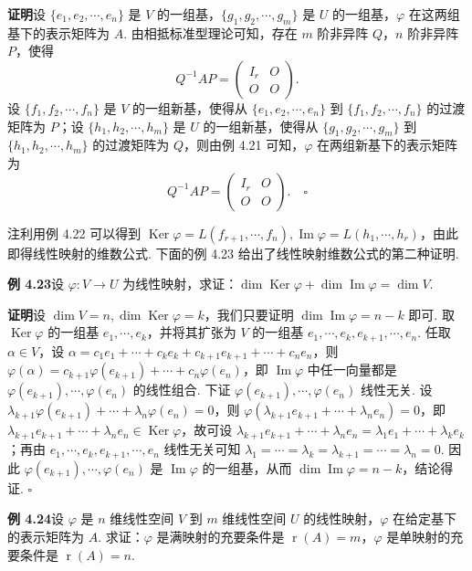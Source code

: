 \documentclass[UTF8,12pt,a4paper,fontset=fandol]{ctexart}
\begin{document}
\noindent\textbf{证明}\quad 设 $\{e_1,e_2,\cdots,e_n\}$ 是 $V$ 的一组基，$\{g_1,g_2,\cdots,g_m\}$ 是 $U$ 的一组基，$\varphi$ 在这两组基下的表示矩阵为 $A$. 由相抵标准型理论可知，存在 $m$ 阶非异阵 $Q$，$n$ 阶非异阵 $P$，使得
\[
Q^{-1}AP=\left(\begin{array}{cc}
I_r & O\\
O & O
\end{array}\right).
\]
设 $\{f_1,f_2,\cdots,f_n\}$ 是 $V$ 的一组新基，使得从 $\{e_1,e_2,\cdots,e_n\}$ 到 $\{f_1,f_2,\cdots,f_n\}$ 的过渡矩阵为 $P$；设 $\{h_1,h_2,\cdots,h_m\}$ 是 $U$ 的一组新基，使得从 $\{g_1,g_2,\cdots,g_m\}$ 到 $\{h_1,h_2,\cdots,h_m\}$ 的过渡矩阵为 $Q$，则由例 4.21 可知，$\varphi$ 在两组新基下的表示矩阵为
\[
Q^{-1}AP=\left(\begin{array}{cc}
I_r & O\\
O & O
\end{array}\right). \quad \square
\]

注\quad 利用例 4.22 可以得到 $\operatorname{Ker}\varphi=L(f_{r+1},\cdots,f_n),\operatorname{Im}\varphi=L(h_1,\cdots,h_r)$，由此即得线性映射的维数公式. 下面的例 4.23 给出了线性映射维数公式的第二种证明.

\noindent\textbf{例 4.23}\quad 设 $\varphi:V\to U$ 为线性映射，求证：$\dim\operatorname{Ker}\varphi+\dim\operatorname{Im}\varphi=\dim V$.

\noindent\textbf{证明}\quad 设 $\dim V=n,\dim\operatorname{Ker}\varphi=k$，我们只要证明 $\dim\operatorname{Im}\varphi=n-k$ 即可. 取 $\operatorname{Ker}\varphi$ 的一组基 $e_1,\cdots,e_k$，并将其扩张为 $V$ 的一组基 $e_1,\cdots,e_k,e_{k+1},\cdots,e_n$. 任取 $\alpha\in V$，设 $\alpha=c_1e_1+\cdots+c_ke_k+c_{k+1}e_{k+1}+\cdots+c_ne_n$，则 $\varphi(\alpha)=c_{k+1}\varphi(e_{k+1})+\cdots+c_n\varphi(e_n)$，即 $\operatorname{Im}\varphi$ 中任一向量都是 $\varphi(e_{k+1}),\cdots,\varphi(e_n)$ 的线性组合. 下证 $\varphi(e_{k+1}),\cdots,\varphi(e_n)$ 线性无关. 设 $\lambda_{k+1}\varphi(e_{k+1})+\cdots+\lambda_n\varphi(e_n)=0$，则 $\varphi(\lambda_{k+1}e_{k+1}+\cdots+\lambda_ne_n)=0$，即 $\lambda_{k+1}e_{k+1}+\cdots+\lambda_ne_n\in\operatorname{Ker}\varphi$，故可设 $\lambda_{k+1}e_{k+1}+\cdots+\lambda_ne_n=\lambda_1e_1+\cdots+\lambda_ke_k$；再由 $e_1,\cdots,e_k,e_{k+1},\cdots,e_n$ 线性无关可知 $\lambda_1=\cdots=\lambda_k=\lambda_{k+1}=\cdots=\lambda_n=0$. 因此 $\varphi(e_{k+1}),\cdots,\varphi(e_n)$ 是 $\operatorname{Im}\varphi$ 的一组基，从而 $\dim\operatorname{Im}\varphi=n-k$，结论得证. $\square$

\noindent\textbf{例 4.24}\quad 设 $\varphi$ 是 $n$ 维线性空间 $V$ 到 $m$ 维线性空间 $U$ 的线性映射，$\varphi$ 在给定基下的表示矩阵为 $A$. 求证：$\varphi$ 是满映射的充要条件是 $\operatorname{r}(A)=m$，$\varphi$ 是单映射的充要条件是 $\operatorname{r}(A)=n$.
\end{document}
